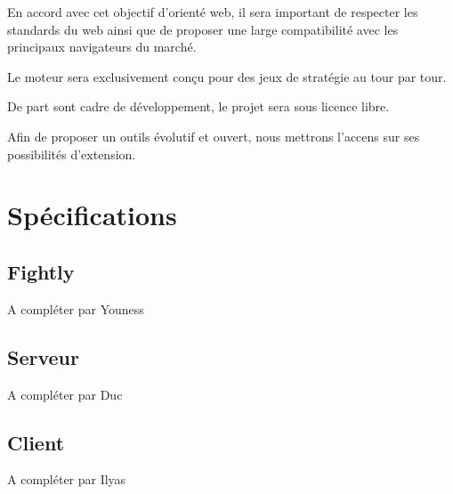 \documentclass[a4paper,10pt]{report}
\begin{document}
En accord avec cet objectif d'orienté web, il sera important de respecter les standards du web ainsi que de proposer une large compatibilité avec les principaux navigateurs du marché.

Le moteur sera exclusivement conçu pour des jeux de stratégie au tour par tour.

De part sont cadre de développement, le projet sera sous licence libre.

Afin de proposer un outils évolutif et ouvert, nous mettrons l'accens sur ses possibilités d'extension.


\section{Spécifications}

\subsection{Fightly}

A compléter par Youness

\subsection{Serveur}

A compléter par Duc

\subsection{Client}

A compléter par Ilyas
\end{document}
